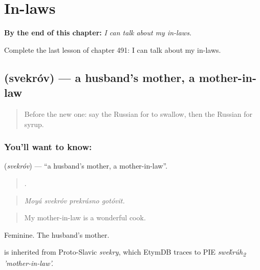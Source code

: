 
\chapter{In-laws}
\label{ch:ru-in-laws}

\begin{chapteropening}
\textbf{By the end of this chapter:} \emph{I can talk about my in-laws.}

Complete the last lesson of chapter 491: I can talk about my in-laws.
\end{chapteropening}

\section[\texorpdfstring{\ru{свекровь} (svekróv)}{свекровь (svekróv)}]{ (svekróv) — a husband's mother, a mother-in-law}

\label{lesson:RU-C491-svekrov}



\begin{quote}
Before the new one: say the Russian for to swallow, then the Russian for syrup.
\end{quote}

\subsection*{You'll want to know: }
\textbf{} (\emph{svekróv}) — \textquotedblleft{}a husband's mother, a mother-in-law\textquotedblright{}.

\begin{quote}
   .
\end{quote}

\begin{quote}
\emph{Moyá svekróv prekrásno gotóvit.}
\end{quote}

\begin{quote}
My mother-in-law is a wonderful cook.
\end{quote}

Feminine. The husband's mother.

\begin{cousinweb}
\emph{} is inherited from Proto-Slavic \emph{svekry}, which EtymDB traces to PIE \emph{swe\'{k}rúh\textsubscript{2} 'mother-in-law'.}
\end{cousinweb}

